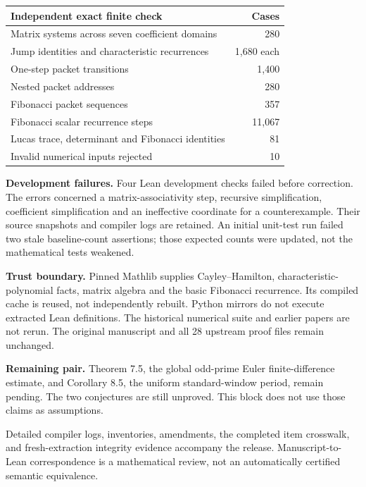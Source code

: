 \begin{center}
\begin{tabular}{@{}lr@{}}
\toprule
Independent exact finite check & Cases\\\midrule
Matrix systems across seven coefficient domains & 280\\
Jump identities and characteristic recurrences & 1,680 each\\
One-step packet transitions & 1,400\\
Nested packet addresses & 280\\
Fibonacci packet sequences & 357\\
Fibonacci scalar recurrence steps & 11,067\\
Lucas trace, determinant and Fibonacci identities & 81\\
Invalid numerical inputs rejected & 10\\\bottomrule
\end{tabular}
\end{center}
\textbf{Development failures.} Four Lean development checks failed before correction. The errors concerned a matrix-associativity step, recursive simplification, coefficient simplification and an ineffective coordinate for a counterexample. Their source snapshots and compiler logs are retained. An initial unit-test run failed two stale baseline-count assertions; those expected counts were updated, not the mathematical tests weakened.

\textbf{Trust boundary.} Pinned Mathlib supplies Cayley--Hamilton, characteristic-polynomial facts, matrix algebra and the basic Fibonacci recurrence. Its compiled cache is reused, not independently rebuilt. Python mirrors do not execute extracted Lean definitions. The historical numerical suite and earlier papers are not rerun. The original manuscript and all 28 upstream proof files remain unchanged.

\textbf{Remaining pair.} Theorem 7.5, the global odd-prime Euler finite-difference estimate, and Corollary 8.5, the uniform standard-window period, remain pending. The two conjectures are still unproved. This block does not use those claims as assumptions.

Detailed compiler logs, inventories, amendments, the completed item crosswalk, and fresh-extraction integrity evidence accompany the release. Manuscript-to-Lean correspondence is a mathematical review, not an automatically certified semantic equivalence.
